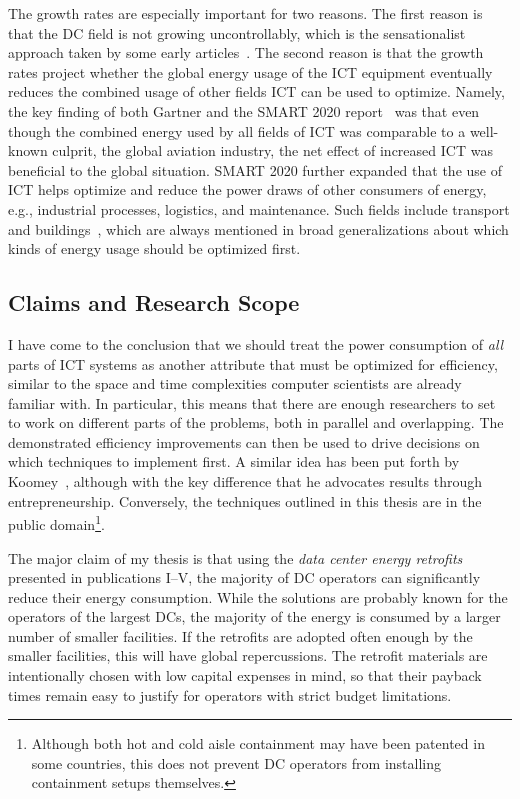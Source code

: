 \documentclass[officiallayout]{tktla}
\begin{document}
The growth rates are especially important for two reasons. The first reason is
that the DC field is not growing uncontrollably, which is the sensationalist
approach taken by some early articles~\cite{Huber1999}. The second reason is
that the growth rates project whether the global energy usage of the ICT
equipment eventually reduces the combined usage of other fields ICT can be
used to optimize.  Namely, the key finding of both Gartner and the SMART 2020
report~\cite{Gartner2007,Webb2008} was that even though the combined energy
used by all fields of ICT was comparable to a well-known culprit, the global
aviation industry, the net effect of increased ICT was beneficial to the
global situation. SMART 2020 further expanded that the use of ICT helps
optimize and reduce the power draws of other consumers of energy, e.g.,
industrial processes, logistics, and maintenance. Such fields include
transport and buildings~\cite{DOE2012}, which are always mentioned in broad
generalizations about which kinds of energy usage should be optimized first.



\subsection{Claims and Research Scope}
\label{sec:scope}

I have come to the conclusion that we should treat the power consumption of
\emph{all} parts of ICT systems as another attribute that must be optimized
for efficiency, similar to the space and time complexities computer scientists
are already familiar with. In particular, this means that there are enough
researchers to set to work on different parts of the problems, both in
parallel and overlapping. The demonstrated efficiency improvements can then be
used to drive decisions on which techniques to implement first. A similar idea
has been put forth by Koomey~\cite{Koomey2012b}, although with the key
difference that he advocates results through entrepreneurship. Conversely, the
techniques outlined in this thesis are in the public domain\footnote{Although
both hot and cold aisle containment may have been patented in some countries,
this does not prevent DC operators from installing containment setups
themselves.}.

The major claim of my thesis is that using the \emph{data center energy
retrofits} presented in publications I--V, the majority of DC operators can
significantly reduce their energy consumption. While the solutions are
probably known for the operators of the largest DCs, the majority of the
energy is consumed by a larger number of smaller facilities. If the retrofits
are adopted often enough by the smaller facilities, this will have global
repercussions. The retrofit materials are intentionally chosen with low
capital expenses in mind, so that their payback times remain easy to justify
for operators with strict budget limitations.
\end{document}
